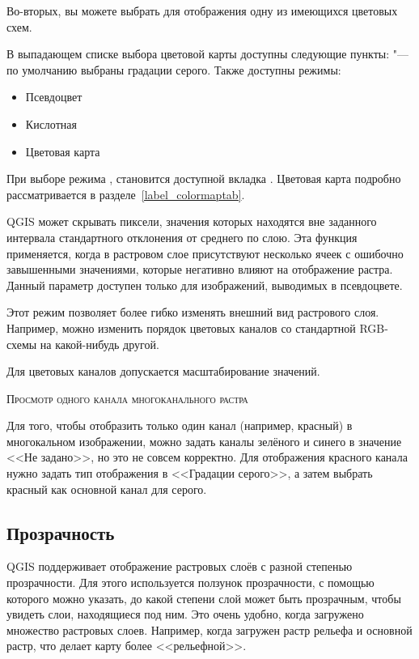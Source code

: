 Во-вторых, вы можете выбрать для отображения одну из имеющихся цветовых схем.

В выпадающем списке выбора цветовой карты доступны следующие пункты:
 "--- по умолчанию выбраны
градации серого. Также доступны режимы:
\begin{itemize}[label=--]
\item Псевдоцвет
\item Кислотная
\item Цветовая карта
\end{itemize}

При выборе режима , становится
доступной вкладка . Цветовая карта подробно
рассматривается в разделе~\ref{label_colormaptab}.

QGIS может скрывать пиксели, значения которых находятся вне заданного
интервала стандартного отклонения от среднего по слою.
Эта функция применяется, когда в растровом слое присутствуют несколько ячеек
с ошибочно завышенными значениями, которые негативно влияют на отображение растра.
Данный параметр доступен только для изображений, выводимых в псевдоцвете.


Этот режим позволяет более гибко изменять внешний вид растрового слоя.
Например, можно изменить порядок цветовых каналов со стандартной RGB-схемы на
какой-нибудь другой.

Для цветовых каналов допускается масштабирование значений.

\begin{Tip}\caption{\textsc{Просмотр одного канала многоканального растра}}
Для того, чтобы отобразить только один канал (например, красный) в
многокальном изображении, можно задать каналы зелёного и синего в значение
<<Не задано>>, но это не совсем корректно. Для отображения красного
канала нужно задать тип отображения в <<Градации серого>>, а затем
выбрать красный как основной канал для серого.
\end{Tip}

\subsection{Прозрачность} \label{rastertab:transparency}

QGIS поддерживает отображение растровых слоёв с разной степенью
прозрачности. Для этого используется
ползунок прозрачности, с помощью которого можно указать, до какой
степени слой может быть прозрачным, чтобы увидеть слои, находящиеся под
ним. Это очень удобно, когда загружено множество растровых слоев.
Например, когда загружен растр рельефа и основной растр, что делает
карту более <<рельефной>>.


